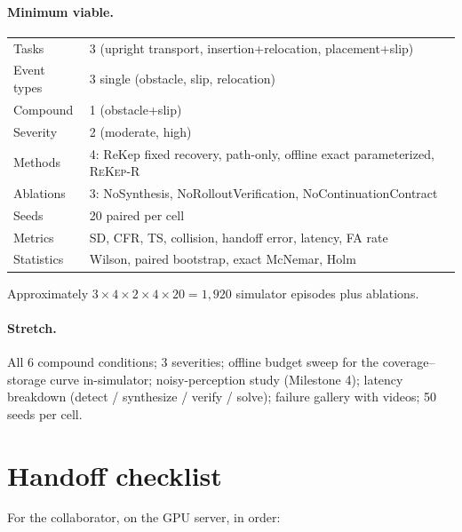 \documentclass[11pt]{article}
\newcommand{\method}{\textsc{ReKep-R}}
\begin{document}
\paragraph{Minimum viable.}
\begin{center}
\begin{tabular}{ll}
\toprule
Tasks & 3 (upright transport, insertion+relocation, placement+slip) \\
Event types & 3 single (obstacle, slip, relocation) \\
Compound & 1 (obstacle+slip) \\
Severity & 2 (moderate, high) \\
Methods & 4: ReKep fixed recovery, path-only, offline exact parameterized, \method{} \\
Ablations & 3: NoSynthesis, NoRolloutVerification, NoContinuationContract \\
Seeds & 20 paired per cell \\
Metrics & SD, CFR, TS, collision, handoff error, latency, FA rate \\
Statistics & Wilson, paired bootstrap, exact McNemar, Holm \\
\bottomrule
\end{tabular}
\end{center}
Approximately $3\times4\times2\times4\times20=1{,}920$ simulator episodes plus
ablations.

\paragraph{Stretch.} All 6 compound conditions; 3 severities; offline
budget sweep for the coverage--storage curve in-simulator; noisy-perception study
(Milestone 4); latency breakdown (detect / synthesize / verify / solve); failure
gallery with videos; 50 seeds per cell.

\section{Handoff checklist}

For the collaborator, on the GPU server, in order:
\end{document}
